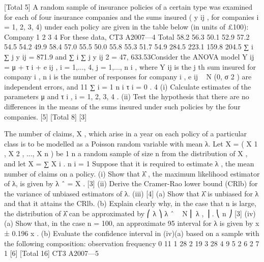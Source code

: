 [Total 5]
A random sample of insurance policies of a certain type was examined for each of
four insurance companies and the sums insured ( y ij , for companies i = 1, 2, 3, 4)
under each policy are given in the table below (in units of £100):
Company
1
2
3
4
For these data,
CT3 A2007—4
Total
58.2
56.3
50.1
52.9
57.2
54.5
54.2
49.9
58.4
57.0
55.5
50.0
55.8
55.3
51.7
54.9
284.5
223.1
159.8
204.5
∑ i ∑ j y ij = 871.9 and ∑ i ∑ j y ij 2 = 47, 633.53Consider the ANOVA model Y ij = μ + τ i + e ij , i = 1,..., 4, j = 1,..., n i , where Y ij is the j th
sum insured for company i , n i is the number of responses for company i ,
e ij ~ N (0, σ 2 ) are independent errors, and
11
∑ i = 1 n i τ i = 0 .
4
(i) Calculate estimates of the parameters μ and τ i , i = 1, 2, 3, 4 .
(ii) Test the hypothesis that there are no differences in the means of the sums
insured under such policies by the four companies.
[5]
[Total 8]
[3]

The number of claims, X , which arise in a year on each policy of a particular class is
to be modelled as a Poisson random variable with mean λ. Let X = ( X 1 , X 2 , ..., X n ) be
1 n
a random sample of size n from the distribution of X , and let X = ∑ X i .
n i = 1
Suppose that it is required to estimate λ , the mean number of claims on a policy.
(i) Show that λ̂ , the maximum likelihood estimator of λ, is given by λ ˆ = X . [3]
(ii) Derive the Cramer-Rao lower bound (CRlb) for the variance of unbiased
estimators of λ.
(iii)
[4]
(a) Show that λ̂ is unbiased for λ and that it attains the CRlb.
(b) Explain clearly why, in the case that n is large, the distribution of λ̂ can
be approximated by
⎛ λ ⎞
λ ˆ ~ N ⎜ λ , ⎟ .
⎝ n ⎠
[3]
(iv)
(a)
Show that, in the case n = 100, an approximate 95%
interval for λ is given by
x ± 0.196 x .
(b)
Evaluate the confidence interval in (iv)(a) based on a sample with the
following composition:
observation
frequency
0
11
1
28
2
19
3
28
4
9
5
2
6
2
7
1
[6]
[Total 16]
CT3 A2007—5

